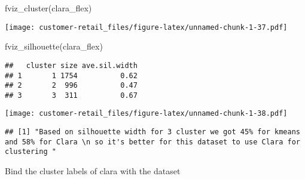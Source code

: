 \documentclass[
]{article}
\newenvironment{Shaded}{\begin{snugshade}}{\end{snugshade}}
\newcommand{\CommentTok}[1]{\textcolor[rgb]{0.56,0.35,0.01}{\textit{#1}}}
\newcommand{\DecValTok}[1]{\textcolor[rgb]{0.00,0.00,0.81}{#1}}
\newcommand{\FunctionTok}[1]{\textcolor[rgb]{0.00,0.00,0.00}{#1}}
\newcommand{\NormalTok}[1]{#1}
\newcommand{\OtherTok}[1]{\textcolor[rgb]{0.56,0.35,0.01}{#1}}
\newcommand{\SpecialCharTok}[1]{\textcolor[rgb]{0.00,0.00,0.00}{#1}}
\newcommand{\StringTok}[1]{\textcolor[rgb]{0.31,0.60,0.02}{#1}}
\begin{document}
\begin{Shaded}
\begin{Highlighting}[]
\FunctionTok{fviz\_cluster}\NormalTok{(clara\_flex)}
\end{Highlighting}
\end{Shaded}

\texttt{[image: customer-retail\_files/figure-latex/unnamed-chunk-1-37.pdf]}

\begin{Shaded}
\begin{Highlighting}[]
\FunctionTok{fviz\_silhouette}\NormalTok{(clara\_flex)}
\end{Highlighting}
\end{Shaded}

\begin{verbatim}
##   cluster size ave.sil.width
## 1       1 1754          0.62
## 2       2  996          0.47
## 3       3  311          0.67
\end{verbatim}

\texttt{[image: customer-retail\_files/figure-latex/unnamed-chunk-1-38.pdf]}

\begin{Shaded}
\end{Shaded}

\begin{verbatim}
## [1] "Based on silhouette width for 3 cluster we got 45% for kmeans and 58% for Clara \n so it's better for this dataset to use Clara for clustering "
\end{verbatim}

\begin{Shaded}
\begin{Highlighting}[]
\StringTok{\textquotesingle{}Bind the cluster labels of clara with the dataset\textquotesingle{}}
\end{Highlighting}
\end{Shaded}
\end{document}

